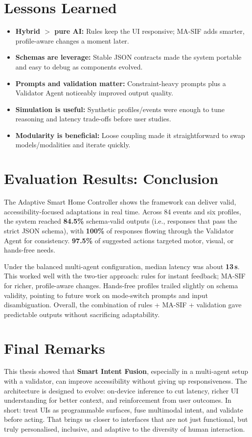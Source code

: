 \documentclass[openany]{book}
\begin{document}
\section{Lessons Learned}
\begin{itemize}
    \item \textbf{Hybrid $>$ pure AI:} Rules keep the UI responsive; MA-SIF adds smarter, profile-aware changes a moment later.
    \item \textbf{Schemas are leverage:} Stable JSON contracts made the system portable and easy to debug as components evolved.
    \item \textbf{Prompts and validation matter:} Constraint-heavy prompts plus a Validator Agent noticeably improved output quality.
    \item \textbf{Simulation is useful:} Synthetic profiles/events were enough to tune reasoning and latency trade-offs before user studies.
    \item \textbf{Modularity is beneficial:} Loose coupling made it straightforward to swap models/modalities and iterate quickly.
\end{itemize}

\section{Evaluation Results: Conclusion}
The Adaptive Smart Home Controller shows the framework can deliver valid, accessibility-focused adaptations in real time. Across 84 events and six profiles, the system reached \textbf{84.5\%} schema-valid outputs (i.e., responses that pass the strict JSON schema), with \textbf{100\%} of responses flowing through the Validator Agent for consistency. \textbf{97.5\%} of suggested actions targeted motor, visual, or hands-free needs.

Under the balanced multi-agent configuration, median latency was about \textbf{13\,s}. This worked well with the two-tier approach: rules for instant feedback; MA-SIF for richer, profile-aware changes. Hands-free profiles trailed slightly on schema validity, pointing to future work on mode-switch prompts and input disambiguation. Overall, the combination of rules + MA-SIF + validation gave predictable outputs without sacrificing adaptability.

\section{Final Remarks}
This thesis showed that \textbf{Smart Intent Fusion}, especially in a multi-agent setup with a validator, can improve accessibility without giving up responsiveness. The architecture is designed to evolve: on-device inference to cut latency, richer UI understanding for better context, and reinforcement from user outcomes. In short: treat UIs as programmable surfaces, fuse multimodal intent, and validate before acting. That brings us closer to interfaces that are not just functional, but truly personalised, inclusive, and adaptive to the diversity of human interaction.

\printbibliography[title=References]
\end{document}
